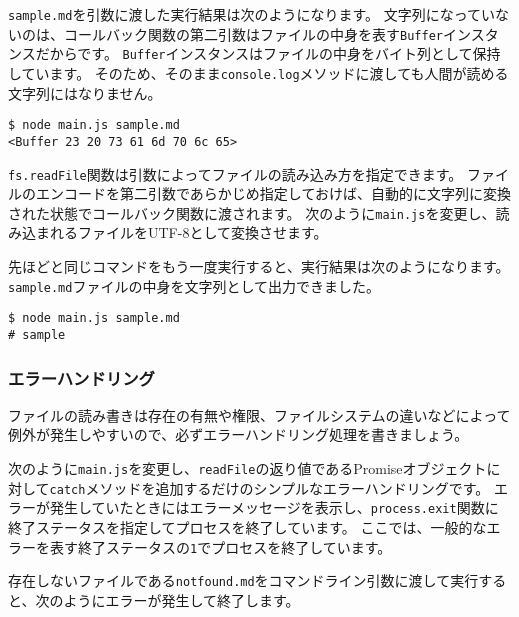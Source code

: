 \texttt{sample.md}を引数に渡した実行結果は次のようになります。
文字列になっていないのは、コールバック関数の第二引数はファイルの中身を表す\texttt{Buffer}インスタンスだからです。
\texttt{Buffer}インスタンスはファイルの中身をバイト列として保持しています。
そのため、そのまま\texttt{console.log}メソッドに渡しても人間が読める文字列にはなりません。

\begin{lstlisting}
$ node main.js sample.md
<Buffer 23 20 73 61 6d 70 6c 65>
\end{lstlisting}

\texttt{fs.readFile}関数は引数によってファイルの読み込み方を指定できます。
ファイルのエンコードを第二引数であらかじめ指定しておけば、自動的に文字列に変換された状態でコールバック関数に渡されます。
次のように\texttt{main.js}を変更し、読み込まれるファイルをUTF-8として変換させます。



先ほどと同じコマンドをもう一度実行すると、実行結果は次のようになります。
\texttt{sample.md}ファイルの中身を文字列として出力できました。

\begin{lstlisting}
$ node main.js sample.md
# sample
\end{lstlisting}

\hypertarget{error-handling}{%
\subsubsection{エラーハンドリング}\label{error-handling}}

ファイルの読み書きは存在の有無や権限、ファイルシステムの違いなどによって例外が発生しやすいので、必ずエラーハンドリング処理を書きましょう。

次のように\texttt{main.js}を変更し、\texttt{readFile}の返り値であるPromiseオブジェクトに対して\texttt{catch}メソッドを追加するだけのシンプルなエラーハンドリングです。
エラーが発生していたときにはエラーメッセージを表示し、\texttt{process.exit}関数に終了ステータスを指定してプロセスを終了しています。
ここでは、一般的なエラーを表す終了ステータスの\texttt{1}でプロセスを終了しています。



存在しないファイルである\texttt{notfound.md}をコマンドライン引数に渡して実行すると、次のようにエラーが発生して終了します。


